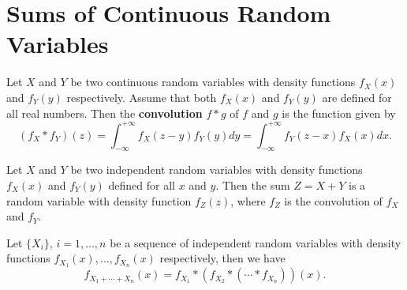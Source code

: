 \section{Sums of Continuous Random Variables}
\begin{definition}
Let $X$ and $Y$ be two continuous random variables with density functions $f_X(x)$ and $f_Y(y)$ respectively. Assume that both $f_X(x)$ and $f_Y(y)$ are defined for all real numbers. Then the \textbf{convolution} $f * g$ of $f$ and $g$ is the function given by
\begin{equation}
    \label{eq:6.2}
    \tag{6-2}
    (f_X * f_Y)(z) = \int_{-\infty}^{+\infty} f_X(z-y) f_Y(y) d y = \int_{-\infty}^{+\infty} f_Y(z-x) f_X(x) d x.
\end{equation}
\end{definition}

\begin{theorem}
Let $X$ and $Y$ be two independent random variables with density functions $f_X(x)$ and $f_Y(y)$ defined for all $x$ and $y$. Then the sum $Z = X + Y$ is a random variable with density function $f_Z(z)$, where $f_Z$ is the convolution of $f_X$ and $f_Y$.
\end{theorem}

\begin{theorem}
Let $\{X_i\}$, $i=1,\dots, n$ be a sequence of independent random variables with density functions $f_{X_1}(x), \dots, f_{X_n}(x)$ respectively, then we have 
\begin{equation*}
    f_{X_1 + \cdots + X_n}(x) = f_{X_1} * \left( f_{X_2} * ( \cdots * f_{X_n}) \right)(x).
\end{equation*}
\end{theorem}

